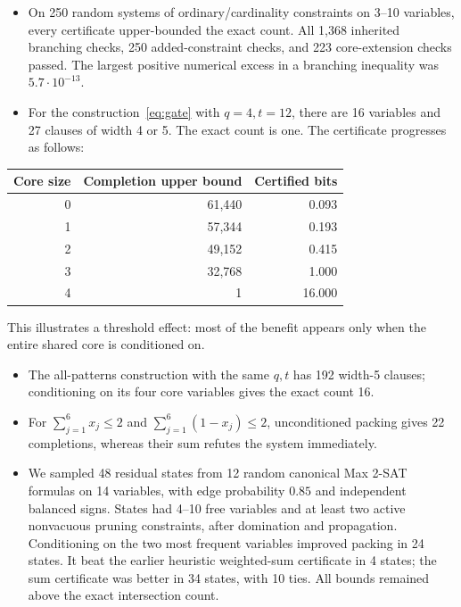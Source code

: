 \documentclass[11pt,a4paper]{article}
\theoremstyle{definition}
\theoremstyle{remark}
\begin{document}
\begin{itemize}
\item On 250 random systems of ordinary/cardinality constraints on
3--10 variables, every certificate upper-bounded the exact count.
All 1,368 inherited branching checks, 250 added-constraint checks, and
223 core-extension checks passed. The largest positive numerical excess
in a branching inequality was $5.7\cdot10^{-13}$.
\item For the construction~\eqref{eq:gate} with $q=4,t=12$, there are
16 variables and 27 clauses of width 4 or 5. The exact count is one.
The certificate progresses as follows:
\end{itemize}
\begin{center}
\begin{tabular}{rrr}
\toprule
Core size & Completion upper bound & Certified bits\\
\midrule
0 & 61,440 & 0.093\\
1 & 57,344 & 0.193\\
2 & 49,152 & 0.415\\
3 & 32,768 & 1.000\\
4 & 1 & 16.000\\
\bottomrule
\end{tabular}
\end{center}
This illustrates a threshold effect: most of the benefit appears only
when the entire shared core is conditioned on.

\begin{itemize}
\item The all-patterns construction with the same $q,t$ has 192
width-5 clauses; conditioning on its four core variables gives the exact
count 16.
\item For $\sum_{j=1}^6x_j\le2$ and
$\sum_{j=1}^6(1-x_j)\le2$, unconditioned packing gives 22 completions,
whereas their sum refutes the system immediately.
\item We sampled 48 residual states from 12 random canonical Max 2-SAT
formulas on 14 variables, with edge probability $0.85$ and independent
balanced signs. States had 4--10 free variables and at least two active
nonvacuous pruning constraints, after domination and propagation.
Conditioning on the two most frequent variables improved packing in
24 states. It beat the earlier heuristic weighted-sum certificate in
4 states; the sum certificate was better in 34 states, with 10 ties.
All bounds remained above the exact intersection count.
\end{itemize}
\end{document}
